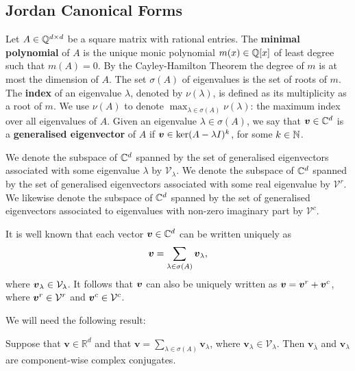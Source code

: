 \subsection{Jordan Canonical Forms}

Let $A \in \mathbb{Q}^{d \times d}$ be a square matrix with rational
entries.  The \textbf{minimal polynomial} of $A$ is the unique monic
polynomial $m(x) \in \mathbb{Q}[x]$ of least degree such that
$m(A)=0$.  By the Cayley-Hamilton Theorem the degree of $m$ is at most
the dimension of $A$. The set $\sigma(A)$ of eigenvalues is the set of
roots of $m$.  The \textbf{index} of an eigenvalue $\lambda$, denoted
by $\nu(\lambda)$, is defined as its multiplicity as a root of $m$. We
use $\nu(A)$ to denote $\max_{\lambda\in\sigma(A)} \nu(\lambda)$: the
maximum index over all eigenvalues of $A$.  Given an eigenvalue
$\lambda \in \sigma(A)$, we say that $\boldsymbol{v} \in \mathbb{C}^{d}$
is a \textbf{generalised eigenvector} of $A$ if
$\boldsymbol{v}\in \ker(A-\lambda I)^{k}$, for some $k\in\mathbb{N}$.

We denote the subspace of $\mathbb{C}^{d}$ spanned by the set of
generalised eigenvectors associated with some eigenvalue $\lambda$ by
$\mathcal{V}_{\lambda}$. We denote the subspace of $\mathbb{C}^{d}$
spanned by the set of generalised eigenvectors associated with some
real eigenvalue by $\mathcal{V}^{r}$.  We likewise denote the subspace
of $\mathbb{C}^{d}$ spanned by the set of generalised eigenvectors
associated to eigenvalues with non-zero imaginary part by
$\mathcal{V}^{c}$.

It is well known that each vector $\boldsymbol{v}\in\mathbb{C}^{d}$
can be written uniquely as
\begin{equation*}
\boldsymbol{v}=\displaystyle{
  \sum\limits_{\lambda\in\sigma(A)}\boldsymbol{v}_{\lambda}},
\end{equation*}
where $\boldsymbol{v}_{\lambda}\in\mathcal{V}_{\lambda}$.
It follows that $\boldsymbol{v}$ can also be uniquely written as
$\boldsymbol{v}=\boldsymbol{v}^{r}+\boldsymbol{v}^{c}$, where
$\boldsymbol{v}^{r} \in\mathcal{V}^{r}$ and
$\boldsymbol{v}^{c} \in\mathcal{V}^{c}$.

We will need the following result:
\begin{proposition}
\label{conj-relation}
Suppose that $\boldsymbol{v}\in\mathbb{R}^{d}$ and that $\boldsymbol{v}=\sum\limits_{\lambda\in\sigma(A)} \boldsymbol{v}_{\lambda}$, where $\boldsymbol{v}_{\lambda} \in\mathcal{V}_{\lambda}$. Then $\boldsymbol{v}_{\overline{\lambda}}$ and $\boldsymbol{v}_{\lambda}$ are component-wise complex conjugates.
\end{proposition}

